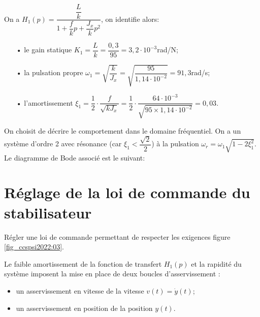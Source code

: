 \ifprof
\begin{corrige}
On a $H_1(p) = \dfrac{\dfrac{L}{k}}{1 + \dfrac{f}{k}p + \dfrac{J_x}{k}p^2}$, on identifie alors:
\begin{itemize}
\item[•] le gain statique $K_1 = \dfrac{L}{k} = \dfrac{0,3}{95} = 3,2\cdot 10^{-3}$rad/N;
\item[•] la pulsation propre $\omega_1 = \sqrt{\dfrac{k}{J_x}} = \sqrt{\dfrac{95}{1,14\cdot 10^{-2}}} = 91,3$rad/s;
\item[•] l'amortissement $\xi_1 = \dfrac{1}{2}\cdot \dfrac{f}{\sqrt{k J_x}} = \dfrac{1}{2}\cdot \dfrac{64\cdot 10^{-3}}{\sqrt{95 \times 1,14\cdot 10^{-2}}} = 0,03$. 
\end{itemize} 

On choisit de décrire le comportement dans le domaine fréquentiel. On a un système d'ordre 2 avec résonance (car $\xi_1 < \dfrac{\sqrt{2}}{2}$) à la pulsation $\omega_r = \omega_1\sqrt{1 - 2\xi_1^2}$. Le diagramme de Bode associé est le suivant:

\begin{figure}[H]
\centering
{}
\end{figure}
\end{corrige}
\else
\fi

\section{Réglage de la loi de commande du stabilisateur}
\begin{obj}
Régler une loi de commande permettant de respecter les exigences figure \ref{fig_ccspsi2022:03}.
\end{obj}
\ifprof
\else
Le faible amortissement de la fonction de transfert $H_{1}(p)$ et la rapidité du système imposent la mise en place de deux boucles d'asservissement :
\begin{itemize}
 \item  un asservissement en vitesse de la vitesse $v(t)=\dot{y}(t)$;
  \item un asservissement en position de la position $y(t)$.
\end{itemize}

